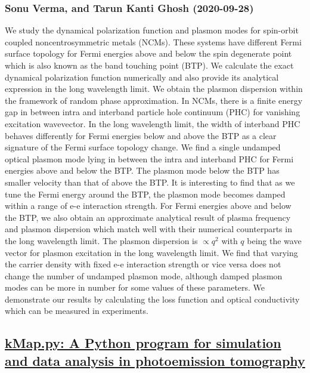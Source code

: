 \subsubsection*{Sonu Verma, and Tarun Kanti Ghosh (2020-09-28)}
We study the dynamical polarization function and plasmon modes for spin-orbit
coupled noncentrosymmetric metals (NCMs). These systems have different Fermi
surface topology for Fermi energies above and below the spin degenerate point
which is also known as the band touching point (BTP). We calculate the exact
dynamical polarization function numerically and also provide its analytical
expression in the long wavelength limit. We obtain the plasmon dispersion
within the framework of random phase approximation. In NCMs, there is a finite
energy gap in between intra and interband particle hole continuum (PHC) for
vanishing excitation wavevector. In the long wavelength limit, the width of
interband PHC behaves differently for Fermi energies below and above the BTP as
a clear signature of the Fermi surface topology change. We find a single
undamped optical plasmon mode lying in between the intra and interband PHC for
Fermi energies above and below the BTP. The plasmon mode below the BTP has
smaller velocity than that of above the BTP. It is interesting to find that as
we tune the Fermi energy around the BTP, the plasmon mode becomes damped within
a range of e-e interaction strength. For Fermi energies above and below the
BTP, we also obtain an approximate analytical result of plasma frequency and
plasmon dispersion which match well with their numerical counterparts in the
long wavelength limit. The plasmon dispersion is $\propto q^2$ with $q$ being
the wave vector for plasmon excitation in the long wavelength limit. We find
that varying the carrier density with fixed e-e interaction strength or vice
versa does not change the number of undamped plasmon mode, although damped
plasmon modes can be more in number for some values of these parameters. We
demonstrate our results by calculating the loss function and optical
conductivity which can be measured in experiments.

\subsection*{\href{http://arxiv.org/abs/2009.13099v1}{kMap.py: A Python program for simulation and data analysis in  photoemission tomography}}
